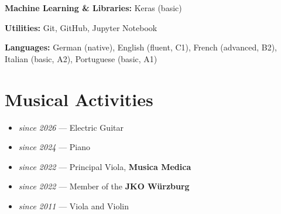 \documentclass[11pt,a4paper]{article}
\begin{document}
\textbf{Machine Learning \& Libraries:} Keras (basic)

\textbf{Utilities:} Git, GitHub, Jupyter Notebook

\textbf{Languages:} German (native), English (fluent, C1), French (advanced, B2), Italian (basic, A2), Portuguese (basic, A1)

\section*{Musical Activities}

\begin{itemize}
  \item \textit{since 2026} — Electric Guitar
  \item \textit{since 2024} — Piano
  \item \textit{since 2022} — Principal Viola, \textbf{Musica Medica}
  \item \textit{since 2022} — Member of the \textbf{JKO Würzburg}
  \item \textit{since 2011} — Viola and Violin
\end{itemize}
\end{document}
